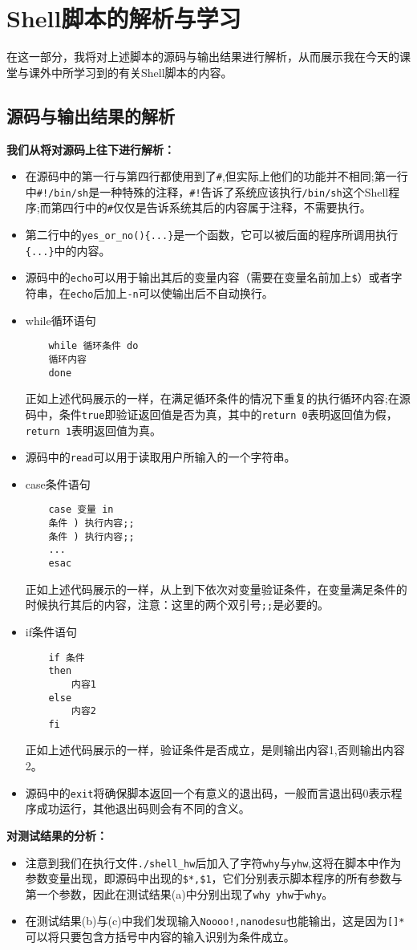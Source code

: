 \documentclass[a4paper]{ctexart}
\begin{document}
\section{Shell脚本的解析与学习}
在这一部分，我将对上述脚本的源码与输出结果进行解析，从而展示我在今天的课堂与课外中所学习到的有关Shell脚本的内容。
\subsection{源码与输出结果的解析}
{\bf 我们从将对源码上往下进行解析：}
\begin{itemize}
\item 在源码中的第一行与第四行都使用到了\verb|#|,但实际上他们的功能并不相同;第一行中\verb|#!/bin/sh|是一种特殊的注释，\verb|#!|告诉了系统应该执行\verb|/bin/sh|这个Shell程序;而第四行中的\verb|#|仅仅是告诉系统其后的内容属于注释，不需要执行。
\item 第二行中的\verb|yes_or_no(){...}|是一个函数，它可以被后面的程序所调用执行\verb|{...}|中的内容。
\item 源码中的\verb|echo|可以用于输出其后的变量内容（需要在变量名前加上\verb|$|）或者字符串，在\verb|echo|后加上\verb|-n|可以使输出后不自动换行。
\item while循环语句
\begin{verbatim}
	while 循环条件 do
	循环内容
	done
\end{verbatim}
正如上述代码展示的一样，在满足循环条件的情况下重复的执行循环内容;在源码中，条件\verb|true|即验证返回值是否为真，其中的\verb|return 0|表明返回值为假，\verb|return 1|表明返回值为真。
\item 源码中的\verb|read|可以用于读取用户所输入的一个字符串。
\item case条件语句
\begin{verbatim}
	case 变量 in
	条件 ) 执行内容;;
	条件 ) 执行内容;;
	...
	esac
\end{verbatim}
正如上述代码展示的一样，从上到下依次对变量验证条件，在变量满足条件的时候执行其后的内容，注意：这里的两个双引号\verb|;;|是必要的。
\item if条件语句
\begin{verbatim}
	if 条件
	then
		内容1
	else
		内容2
	fi
\end{verbatim}
正如上述代码展示的一样，验证条件是否成立，是则输出内容1,否则输出内容2。
\item 源码中的\verb|exit|将确保脚本返回一个有意义的退出码，一般而言退出码0表示程序成功运行，其他退出码则会有不同的含义。
\end{itemize}

{\bf 对测试结果的分析：}
\begin{itemize}
\item 注意到我们在执行文件\verb|./shell_hw|后加入了字符\verb|why|与\verb|yhw|,这将在脚本中作为参数变量出现，即源码中出现的\verb|$*,$1|，它们分别表示脚本程序的所有参数与第一个参数，因此在测试结果(a)中分别出现了\verb|why yhw|于\verb|why|。
\item 在测试结果(b)与(c)中我们发现输入\verb|Noooo!,nanodesu|也能输出，这是因为\verb|[]*|可以将只要包含方括号中内容的输入识别为条件成立。
\end{itemize}
\end{document}
